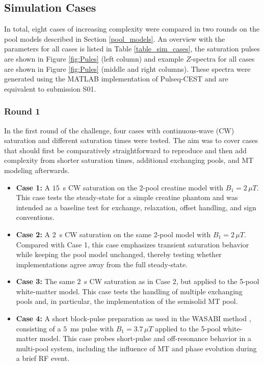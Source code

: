 \documentclass[11pt,a4paper]{article}
\begin{document}
\subsection{Simulation Cases}
In total, eight cases of increasing complexity were compared in two rounds on the pool models described in Section \ref{pool_models}. An overview with the parameters for all cases is listed in Table \ref{table_sim_cases}, the saturation pulses are shown in Figure \ref{fig:Pules} (left column) and example $Z$-spectra for all cases are shown in Figure \ref{fig:Pules} (middle and right columns). These spectra were generated using the MATLAB implementation of Pulseq-CEST \cite{Herz2021} and are equivalent to submission S01.

\subsubsection{Round 1}


In the first round of the challenge, four cases with continuous-wave (CW) saturation and different saturation times were tested. The aim was to cover cases that should first be comparatively straightforward to reproduce and then add complexity from shorter saturation times, additional exchanging pools, and MT modeling afterwards.
\begin{itemize}
\item \textbf{Case 1:} A $15$~s CW saturation on the 2-pool creatine model with $B_{1}=2\,\mu T$. This case tests the steady-state for a simple creatine phantom and was intended as a baseline test for exchange, relaxation, offset handling, and sign conventions.
\item \textbf{Case 2:} A $2$~s CW saturation on the same 2-pool model with $B_{1}=2\,\mu T$. Compared with Case 1, this case emphasizes transient saturation behavior while keeping the pool model unchanged, thereby testing whether implementations agree away from the full steady-state.
\item \textbf{Case 3:} The same $2$~s CW saturation as in Case 2, but applied to the 5-pool white-matter model. This case tests the handling of multiple exchanging pools and, in particular, the implementation of the semisolid MT pool.
\item \textbf{Case 4:} A short block-pulse preparation as used in the WASABI method \cite{Schuenke2017}, consisting of a $5$~ms pulse with $B_{1}=3.7\,\mu T$ applied to the 5-pool white-matter model. This case probes short-pulse and off-resonance behavior in a multi-pool system, including the influence of MT and phase evolution during a brief RF event.
\end{itemize}
\end{document}
